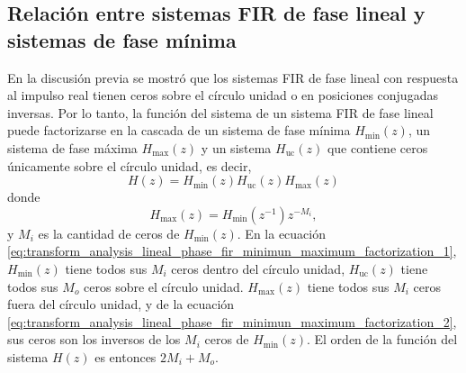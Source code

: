 \documentclass[a4paper]{report}
\begin{document}
\subsection{Relación entre sistemas FIR de fase lineal y sistemas de fase mínima}

En la discusión previa se mostró que los sistemas FIR de fase lineal con respuesta al impulso real tienen ceros sobre el círculo unidad o en posiciones conjugadas inversas. Por lo tanto, la función del sistema de un sistema FIR de fase lineal puede factorizarse en la cascada de un sistema de fase mínima \(H_\textrm{min}(z)\), un sistema de fase máxima \(H_\textrm{max}(z)\) y un sistema \(H_\textrm{uc}(z)\) que contiene ceros únicamente sobre el círculo unidad, es decir,
\begin{equation}\label{eq:transform_analysis_lineal_phase_fir_minimun_maximum_factorization_1}
 H(z)=H_\textrm{min}(z)H_\textrm{uc}(z)H_\textrm{max}(z) 
\end{equation}
donde
\begin{equation}\label{eq:transform_analysis_lineal_phase_fir_minimun_maximum_factorization_2}
 H_\textrm{max}(z)=H_\textrm{min}(z^{-1})z^{-M_i}, 
\end{equation}
y \(M_i\) es la cantidad de ceros de \(H_\textrm{min}(z)\). En la ecuación \ref{eq:transform_analysis_lineal_phase_fir_minimun_maximum_factorization_1}, \(H_\textrm{min}(z)\) tiene todos sus \(M_i\) ceros dentro del círculo unidad, \(H_\textrm{uc}(z)\) tiene todos sus \(M_o\) ceros sobre el círculo unidad. \(H_\textrm{max}(z)\) tiene todos sus \(M_i\) ceros fuera del círculo unidad, y de la ecuación \ref{eq:transform_analysis_lineal_phase_fir_minimun_maximum_factorization_2}, sus ceros son los inversos de los \(M_i\) ceros de \(H_\textrm{min}(z)\). El orden de la función del sistema \(H(z)\) es entonces \(2M_i+M_o\).
\end{document}
